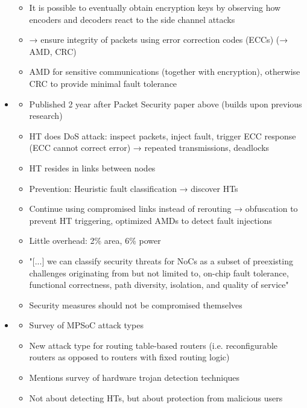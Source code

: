 \begin{itemize}
\begin{itemize}
            \item It is possible to eventually obtain encryption keys by observing how encoders and decoders react to the side channel attacks
            \item → ensure integrity of packets using error correction codes (ECCs) (→ AMD, CRC)
            \item AMD for sensitive communications (together with encryption), otherwise CRC to provide minimal fault tolerance
        \end{itemize}
    \item \textbf{}
        \begin{itemize}
            \item Published 2 year after Packet Security paper above (builds upon previous research)
            \item HT does DoS attack: inspect packets, inject fault, trigger ECC response (ECC cannot correct error) → repeated transmissions,
                deadlocks
            \item HT resides in links between nodes
            \item Prevention: Heuristic fault classification → discover HTs
            \item Continue using compromised links instead of rerouting → obfuscation to prevent HT triggering, optimized AMDs to detect fault
                injections
            \item Little overhead: 2\% area, 6\% power
            \item "[...] we can classify security threats for NoCs as a subset of preexisting challenges originating from but not limited to,
                on-chip fault tolerance, functional correctness, path diversity, isolation, and quality of service"
            \item Security measures should not be compromised themselves
        \end{itemize}
    \item \textbf{}
        \begin{itemize}
            \item Survey of MPSoC attack types
            \item New attack type for routing table-based routers (i.e. reconfigurable routers as opposed to routers with fixed routing logic)
            \item Mentions survey of hardware trojan detection techniques
            \item Not about detecting HTs, but about protection from malicious users

\end{itemize}
\end{itemize}
